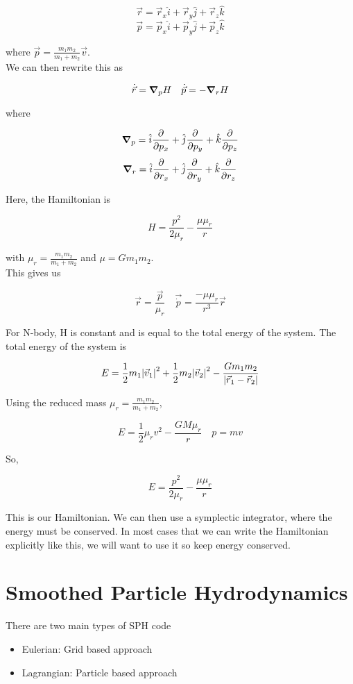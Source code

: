 \documentclass[]{article}
\begin{document}
\[\vec{r} = \vec{r}_x \hat{i} + \vec{r}_y \hat{j} + \vec{r}_z \hat{k}\]
\[\vec{p} = \vec{p}_x \hat{i} + \vec{p}_y \hat{j} + \vec{p}_z \hat{k}\] 

where $\vec{p} = \frac{m_1m_2}{m_1+m_2}\vec{v}$.\\

We can then rewrite this as 

\[\dot{\vec{r}} = \grad_p{H} \quad \dot{\vec{p}} = -\grad_r{H}\]

where 

\[\grad_p{} = \hat{i} \pdv{}{p_x}+ \hat{j} \pdv{}{p_y} + \hat{k} \pdv{}{p_z}\]
\[\grad_r{} = \hat{i} \pdv{}{r_x}+ \hat{j} \pdv{}{r_y} + \hat{k} \pdv{}{r_z}\]

Here, the Hamiltonian is 

\[H = \frac{p^2}{2\mu_r} - \frac{\mu\mu_r}{r}\]

with $\mu_r = \frac{m_1m_2}{m_1+m_2}$ and $\mu = Gm_1m_2$.\\

This gives us 

\[\vec{r} = \frac{\vec{p}}{\mu_r} \quad \vec{\dot{p}} = \frac{-\mu\mu_r}{r^3}\vec{r}\]


For N-body, H is constant and is equal to the total energy of the system. The total energy of the system is

\[E = \frac{1}{2}m_1\abs{\vec{v}_1}^2 + \frac{1}{2}m_2\abs{\vec{v}_2}^2 - \frac{Gm_1m_2}{\abs{\vec{r}_1 - \vec{r}_2}}\]

Using the reduced mass $\mu_r = \frac{m_1m_2}{m_1+m_2}$,

\[E = \frac{1}{2}\mu_r v^2 - \frac{GM\mu_r}{r} \quad p = mv\]

So,

\[E = \frac{p^2}{2\mu_r} - \frac{\mu\mu_r}{r}\]

This is our Hamiltonian. We can then use a symplectic integrator, where the energy must be conserved. In most cases that we can write the Hamiltonian explicitly like this, we will want to use it so keep energy conserved.



\section{Smoothed Particle Hydrodynamics}\bigbreak\bigbreak

There are two main types of SPH code

\begin{itemize}
	\item Eulerian: Grid based approach
	\item Lagrangian: Particle based approach
\end{itemize}\bigbreak
\end{document}
